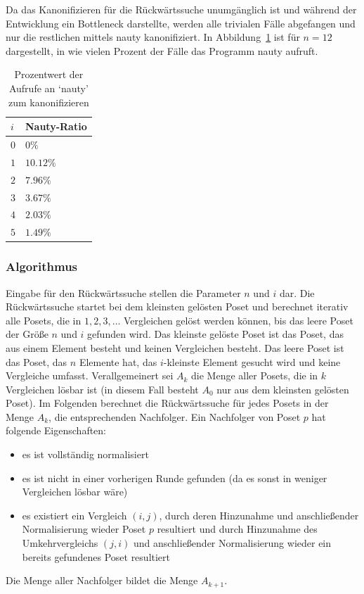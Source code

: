 \documentclass[10pt,journal,compsoc]{IEEEtran}
\begin{document}
Da das Kanonifizieren für die Rückwärtssuche unumgänglich ist und während der Entwicklung ein Bottleneck darstellte, werden alle trivialen Fälle abgefangen und nur die restlichen mittels nauty kanonifiziert.
In Abbildung~\ref{table:nauty-ratio} ist für $n = 12$ dargestellt, in wie vielen Prozent der Fälle das Programm nauty aufruft.

\begin{table}
  \begin{tabular}{l|l}
    $i$ & Nauty-Ratio \\ %
    \hline
    $0$ & $0\%$       \\
    $1$ & $10.12\%$   \\
    $2$ & $7.96\%$    \\
    $3$ & $3.67\%$    \\
    $4$ & $2.03\%$    \\
    $5$ & $1.49\%$
  \end{tabular}
  \centering
  \caption{Prozentwert der Aufrufe an `nauty' zum kanonifizieren}
  \label{table:nauty-ratio}
\end{table}

\subsubsection{Algorithmus}
Eingabe für den Rückwärtssuche stellen die Parameter $n$ und $i$ dar.
Die Rückwärtssuche startet bei dem kleinsten gelösten Poset und berechnet iterativ alle Posets, die in $1, 2, 3, \dots$ Vergleichen gelöst werden können, bis das leere Poset der Größe $n$ und $i$ gefunden wird.
Das kleinste gelöste Poset ist das Poset, das aus einem Element besteht und keinen Vergleichen besteht.
Das leere Poset ist das Poset, das $n$ Elemente hat, das $i$-kleinste Element gesucht wird und keine Vergleiche umfasst.
Verallgemeinert sei $A_k$ die Menge aller Posets, die in $k$ Vergleichen lösbar ist (in diesem Fall besteht $A_0$ nur aus dem kleinsten gelösten Poset).
Im Folgenden berechnet die Rückwärtssuche für jedes Posets in der Menge $A_k$, die entsprechenden Nachfolger.
Ein Nachfolger von Poset $p$ hat folgende Eigenschaften:
\begin{itemize}
  \item es ist vollständig normalisiert
  \item es ist nicht in einer vorherigen Runde gefunden (da es sonst in weniger Vergleichen lösbar wäre)
  \item es existiert ein Vergleich $(i, j)$, durch deren Hinzunahme und anschließender Normalisierung wieder Poset $p$ resultiert und durch Hinzunahme des Umkehrvergleichs $(j, i)$ und anschließender Normalisierung wieder ein bereits gefundenes Poset resultiert
\end{itemize}
Die Menge aller Nachfolger bildet die Menge $A_{k + 1}$.
\end{document}
